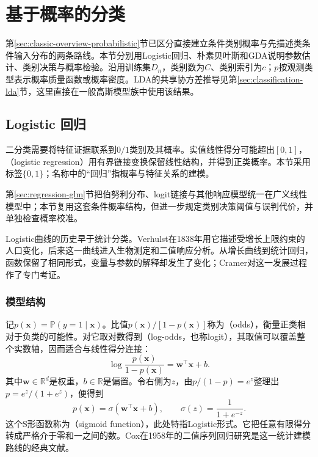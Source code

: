 \section{基于概率的分类}
\label{sec:classification-probability}

第\ref{sec:classic-overview-probabilistic}节已区分直接建立条件类别概率与先描述类条件输入分布的两条路线。本节分别用Logistic回归、朴素贝叶斯和GDA说明参数估计、类别决策与概率检验。沿用训练集$D_n$，类别数为$C$、类别索引为$c$；$p$按观测类型表示概率质量函数或概率密度。LDA的共享协方差推导见第\ref{sec:classification-lda}节，这里直接在一般高斯模型族中使用该结果。

\subsection{Logistic 回归}
\label{sec:classification-logistic}

二分类需要将特征证据联系到$0/1$类别及其概率。实值线性得分可能超出$[0,1]$，（logistic regression）用有界链接变换保留线性结构，并得到正类概率。本节采用标签$\{0,1\}$；名称中的“回归”指概率与特征关系的建模。

第\ref{sec:regression-glm}节把伯努利分布、logit链接与其他响应模型统一在广义线性模型中；本节复用这套条件概率结构，但进一步规定类别决策阈值与误判代价，并单独检查概率校准。

Logistic曲线的历史早于统计分类。Verhulst在1838年用它描述受增长上限约束的人口变化，后来这一曲线进入生物测定和二值响应分析。从增长曲线到统计回归，函数保留了相同形式，变量与参数的解释却发生了变化；Cramer对这一发展过程作了专门考证。

\subsubsection{模型结构}
\label{sec:classification-logistic-structure}

记$p(\bm{x})=\mathbb{P}(y=1\mid\bm{x})$。比值$p(\bm{x})/[1-p(\bm{x})]$称为（odds），衡量正类相对于负类的可能性。对它取对数得到（log-odds，也称logit），其取值可以覆盖整个实数轴，因而适合与线性得分连接：
\begin{equation}
  \label{eq:classification-logistic-logodds}
  \log\frac{p(\bm{x})}{1-p(\bm{x})}
  =\bm{w}^{\top}\bm{x}+b.
\end{equation}
其中$\bm{w}\in\mathbb{R}^{d}$是权重，$b\in\mathbb{R}$是偏置。令右侧为$z$，由$p/(1-p)=e^z$整理出$p=e^z/(1+e^z)$，便得到
\begin{equation}
  \label{eq:classification-logistic-sigmoid}
  p(\bm{x})=\sigma(\bm{w}^{\top}\bm{x}+b),
  \qquad
  \sigma(z)=\frac{1}{1+e^{-z}}.
\end{equation}
这个S形函数称为（sigmoid function），此处特指Logistic形式。它把任意有限得分转成严格介于零和一之间的数。Cox在1958年的二值序列回归研究是这一统计建模路线的经典文献。

